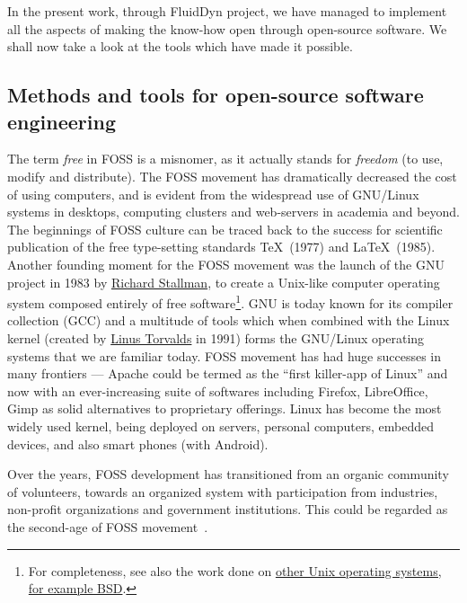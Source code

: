 In the present work, through FluidDyn project, we have managed to implement all
the aspects of making the know-how open through open-source software. We shall
now take a look at the tools which have made it possible.

\subsection{Methods and tools for open-source software engineering}

 The term \emph{free} in
FOSS is a misnomer, as it actually stands for \emph{freedom} (to use, modify
and distribute). The FOSS movement has dramatically decreased the cost of using
computers, and is evident from the widespread use of GNU/Linux systems in
desktops, computing clusters and web-servers in academia and beyond.
%
The beginnings of FOSS culture can be traced back to the success for scientific
publication of the free type-setting standards \TeX\ (1977) and \LaTeX\ (1985).
%
Another founding moment for the FOSS movement was the launch of the GNU project
in 1983 by \href{https://en.wikipedia.org/wiki/Richard_Stallman}{Richard
Stallman}, to create a Unix-like computer operating system composed entirely of
free software\footnote{For completeness, see also the work done on
\href{https://www.levenez.com/unix/}{other Unix operating systems,
for example BSD}.}.
%
GNU is today known for its compiler collection (GCC) and a multitude of tools
which when combined with the Linux kernel (created by
\href{https://en.wikipedia.org/wiki/Linus_Torvalds}{Linus Torvalds} in 1991)
forms the GNU/Linux operating systems that we are familiar today.
%
FOSS movement has had huge successes in many frontiers --- Apache could be
termed as the ``first killer-app of Linux'' and now with an ever-increasing
suite of softwares including Firefox, LibreOffice, Gimp as solid alternatives
to proprietary offerings.
%
Linux has become the most widely used kernel, being deployed on servers,
personal computers, embedded devices, and also smart phones (with Android).


Over the years, FOSS development has transitioned from an organic community of
volunteers, towards an organized system with participation from industries,
non-profit organizations and government institutions. This could be regarded as
the second-age of FOSS movement~\citep{fitzgerald_transformation_2006}.

